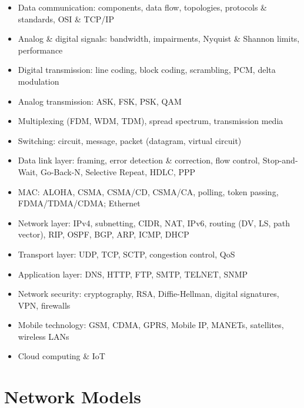 

\begin{sylbox}

\begin{itemize}
\tightlist
\item[$\square$]
  Data communication: components, data flow, topologies, protocols \& standards, OSI \& TCP/IP
\item[$\square$]
  Analog \& digital signals: bandwidth, impairments, Nyquist \& Shannon limits, performance
\item[$\square$]
  Digital transmission: line coding, block coding, scrambling, PCM, delta modulation
\item[$\square$]
  Analog transmission: ASK, FSK, PSK, QAM
\item[$\square$]
  Multiplexing (FDM, WDM, TDM), spread spectrum, transmission media
\item[$\square$]
  Switching: circuit, message, packet (datagram, virtual circuit)
\item[$\square$]
  Data link layer: framing, error detection \& correction, flow control, Stop-and-Wait, Go-Back-N, Selective Repeat, HDLC, PPP
\item[$\square$]
  MAC: ALOHA, CSMA, CSMA/CD, CSMA/CA, polling, token passing, FDMA/TDMA/CDMA; Ethernet
\item[$\square$]
  Network layer: IPv4, subnetting, CIDR, NAT, IPv6, routing (DV, LS, path vector), RIP, OSPF, BGP, ARP, ICMP, DHCP
\item[$\square$]
  Transport layer: UDP, TCP, SCTP, congestion control, QoS
\item[$\square$]
  Application layer: DNS, HTTP, FTP, SMTP, TELNET, SNMP
\item[$\square$]
  Network security: cryptography, RSA, Diffie-Hellman, digital signatures, VPN, firewalls
\item[$\square$]
  Mobile technology: GSM, CDMA, GPRS, Mobile IP, MANETs, satellites, wireless LANs
\item[$\square$]
  Cloud computing \& IoT
\end{itemize}

\end{sylbox}

\needspace{161pt}

\hypertarget{p2-09--1-network-models}{%
\section{Network Models}\label{p2-09--1-network-models}}

